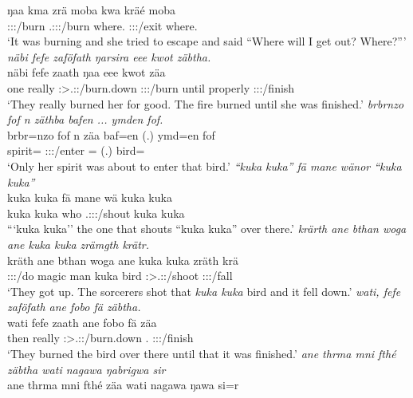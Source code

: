 \begin{exe}
	\gll ŋaa kma zrä moba kwa kräé moba\\
	\Sg:\Sbj:\Pst:\Ipfv/burn \Pot{} \Tsg.\F:\Sbj:\Irr:\Pfv/burn where.\Abl{} \Fut{} \Fsg:\Sbj:\Irr:\Pfv/exit where.\Abl{}\\
	\trans `It was burning and she tried to escape and said ``Where will I get out? Where?'''
	\emph{näbi fefe zaföfath ŋarsira eee kwot zäbtha.}\\
	\gll näbi fefe zaath ŋaa eee kwot zäa\\
	one really \Stpl:\Sbj>\Tsg.\F:\Pst:\Pfv/burn.down \Sg:\Sbj:\Pst:\Ipfv/burn until properly \Sg:\Sbj:\Pst:\Pfv/finish\\
	\trans `They really burned her for good. The fire burned until she was finished.'
	\emph{brbrnzo fof n zäthba bafen ... ymden fof.}\\
	\gll brbr=nzo fof n zäa baf=en (.) ymd=en fof\\
	spirit=\Only{} \Emph{} \Imn{} \Sg:\Sbj:\Pst:\Pfv/enter \Recog=\Loc{} (.) bird=\Loc{} \Emph\\
	\trans `Only her spirit was about to enter that bird.'
	\emph{``kuka kuka'' fä mane wänor ``kuka kuka''}\\
	\gll kuka kuka fä mane wä kuka kuka\\
	kuka kuka \Dist{} who \Tsg.\F:\Sbj:\Nonpast:\Ipfv/shout kuka kuka\\
	\trans ```kuka kuka'' the one that shouts ``kuka kuka'' over there.'
	\emph{krärth ane bthan woga ane kuka kuka zrämgth krätr.}\\
	\gll kräth ane bthan woga ane {kuka kuka} zräth krä\\
	\Stpl:\Sbj:\Irr:\Pfv/do \Dem{} magic man \Dem{} {kuka bird} \Stpl:\Sbj>\Tsg.\F:\Irr:\Pfv/shoot \Stsg:\Sbj:\Irr:\Pfv/fall\\
	\trans `They got up. The sorcerers shot that \emph{kuka kuka} bird and it fell down.'
	\emph{wati, fefe zaföfath ane fobo fä zäbtha.}\\
	\gll wati fefe zaath ane fobo fä zäa\\
	then really \Stpl:\Sbj>\Tsg.\F:\Pst:\Pfv/burn.down \Dem{} \Dist.\All{} \Dist{} \Sg:\Sbj:\Pst:\Pfv/finish\\
	\trans `They burned the bird  over there until that it was finished.'
	\emph{ane thrma mni fthé zäbtha wati nagawa ŋabrigwa sir}\\
	\gll  ane thrma mni fthé zäa wati nagawa ŋawa si=r\\

\end{exe}
